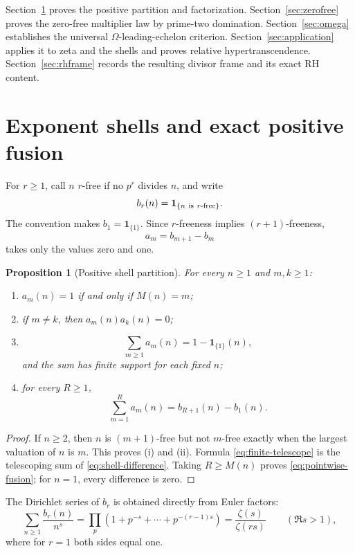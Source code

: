\documentclass[11pt]{article}
\newtheorem{proposition}[theorem]{Proposition}
\theoremstyle{definition}
\theoremstyle{remark}
\begin{document}
Section~\ref{sec:shells} proves the positive partition and factorization.
Section~\ref{sec:zerofree} proves the zero-free multiplier law by prime-two domination.
Section~\ref{sec:omega} establishes the universal \(\Omega\)-leading-echelon criterion.
Section~\ref{sec:application} applies it to zeta and the shells and proves relative
hypertranscendence.  Section~\ref{sec:rhframe} records the resulting divisor frame and its exact
RH content.

\section{Exponent shells and exact positive fusion}\label{sec:shells}

For \(r\geq1\), call \(n\) \(r\)-free if no \(p^r\) divides \(n\), and write
\[
 b_r(n)=\mathbf 1_{\{n\ {\rm is}\ r\text{-free}\}}.
\]
The convention makes \(b_1=\mathbf 1_{\{1\}}\).  Since \(r\)-freeness implies
\((r+1)\)-freeness,
\[
 a_m=b_{m+1}-b_m
 \label{eq:shell-difference}
 \tag{2.1}
\]
takes only the values zero and one.

\begin{proposition}[Positive shell partition]\label{prop:partition}
For every \(n\geq1\) and \(m,k\geq1\):
\begin{enumerate}[label=\textup{(\roman*)}]
\item \(a_m(n)=1\) if and only if \(M(n)=m\);
\item if \(m\ne k\), then \(a_m(n)a_k(n)=0\);
\item
\[
 \sum_{m\geq1}a_m(n)=1-\mathbf 1_{\{1\}}(n),
 \label{eq:pointwise-fusion}
 \tag{2.2}
\]
and the sum has finite support for each fixed \(n\);
\item for every \(R\geq1\),
\[
 \sum_{m=1}^{R}a_m(n)=b_{R+1}(n)-b_1(n).
 \label{eq:finite-telescope}
 \tag{2.3}
\]
\end{enumerate}
\end{proposition}

\begin{proof}
If \(n\geq2\), then \(n\) is \((m+1)\)-free but not \(m\)-free exactly when the largest
valuation of \(n\) is \(m\).  This proves (i) and (ii).  Formula \eqref{eq:finite-telescope}
is the telescoping sum of \eqref{eq:shell-difference}.  Taking
\(R\geq M(n)\) proves \eqref{eq:pointwise-fusion}; for \(n=1\), every difference is zero.
\end{proof}

The Dirichlet series of \(b_r\) is obtained directly from Euler factors:
\[
 \sum_{n\geq1}\frac{b_r(n)}{n^s}
 =\prod_p(1+p^{-s}+\cdots+p^{-(r-1)s})
 =\frac{\zeta(s)}{\zeta(rs)}
 \qquad(\Re s>1),
 \label{eq:mfree-series}
 \tag{2.4}
\]
where for \(r=1\) both sides equal one.
\end{document}
